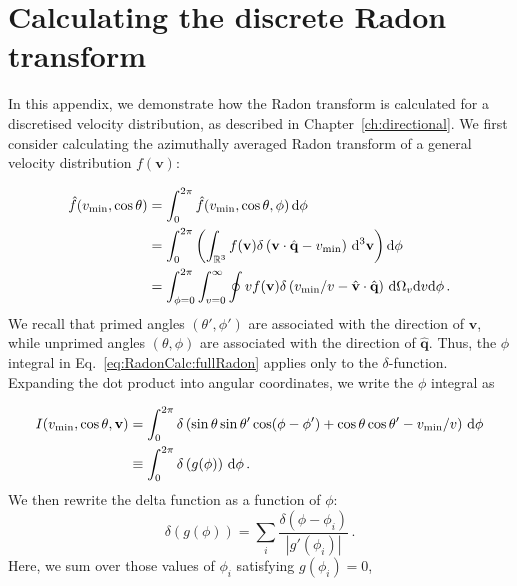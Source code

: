 \chapter[The discrete Radon transform]{Calculating the discrete Radon transform}
\label{ch:RadonCalc}

In this appendix, we demonstrate how the Radon transform is calculated for a discretised velocity distribution, as described in Chapter~\ref{ch:directional}. We first consider calculating the azimuthally averaged Radon transform of a general velocity distribution $f(\textbf{v})$:

\begin{align}
\label{eq:RadonCalc:fullRadon}
\hat{f}(\vmin, \cos\theta) &= \int_0^{2\pi} \hat{f}(\vmin, \cos\theta, \phi) \, \mathrm{d}\phi \notag\\
&= \int_0^{2\pi}\left( \int_{\mathbb{R}^3} f(\mathbf{v}) \delta\left(\mathbf{v}\cdot\hat{\mathbf{q}} - \vmin \right)\, \mathrm{d}^3\mathbf{v} \right) \mathrm{d}\phi \\
&= \int_{\phi = 0}^{2\pi} \int_{v = 0}^{\infty} \oint v f(\textbf{v}) \delta\left(v_\textrm{min}/v - \hat{\textbf{v}}\cdot\hat{\textbf{q}}\right) \, \mathrm{d}\Omega_v \mathrm{d}v \mathrm{d}\phi \notag\,.
\end{align}
We recall that primed angles $(\theta',\phi')$ are associated with the direction of $\textbf{v}$, while unprimed angles $(\theta, \phi)$ are associated with the direction of $\hat{\textbf{q}}$. Thus, the $\phi$ integral in Eq.~\ref{eq:RadonCalc:fullRadon} applies only to the $\delta$-function. Expanding the dot product into angular coordinates, we write the $\phi$ integral as

\begin{align}
I(\vmin, \cos\theta, \mathbf{v}) &= \int_{0}^{2\pi} \delta\left(\sin\theta\sin\theta' \cos(\phi-\phi') + \cos\theta\cos\theta' - \vmin/v\right) \label{eq:defI} \, \mathrm{d}\phi \notag\\
&\equiv \int_{0}^{2\pi} \delta\left(g(\phi)\right) \, \mathrm{d}\phi\,.
\end{align}
We then rewrite the delta function as a function of $\phi$:
\begin{equation}
\label{eq:RadonCalc:deltadecomp}
\delta\left(g(\phi)\right) = \sum_{i} \frac{\delta(\phi - \phi_i)}{|g'(\phi_i)|}\,.
\end{equation}
Here, we sum over those values of $\phi_i$ satisfying $g(\phi_i) = 0$,

